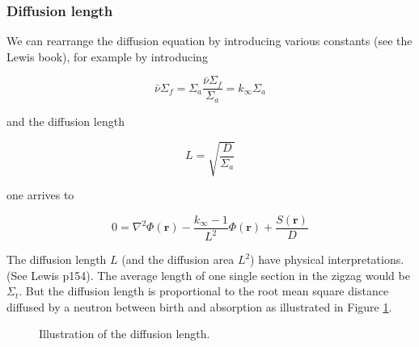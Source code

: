 \subsubsection{Diffusion length}

We can rearrange the diffusion equation by introducing various constants (see the Lewis book), for example by introducing

$$\bar\nu\Sigma_f=\Sigma_a\frac{\bar\nu\Sigma_f}{\Sigma_a}=k_\infty\Sigma_a$$

\noindent and the diffusion length

$$L=\sqrt{\frac{D}{\Sigma_a}}$$

\noindent one arrives to

\begin{equation}
0= \nabla^2 \Phi(\mathbf{r})-\frac{k_\infty-1}{L^2}\Phi(\mathbf{r})+\frac{S(\mathbf{r})}{D}
\end{equation}

The diffusion length $L$ (and the diffusion area $L^2$) have physical interpretations. (See Lewis p154). The average length of one single section in the zigzag would be $\Sigma_t$. But the diffusion length is proportional to the root mean square distance diffused by a neutron between birth and absorption as illustrated in Figure \ref{fig:diffusionlength}.

\begin{figure}[ht!]
\protect {}\protect
\caption{\label{fig:diffusionlength} \footnotesize{Illustration of the diffusion length.}}
\end{figure} 

